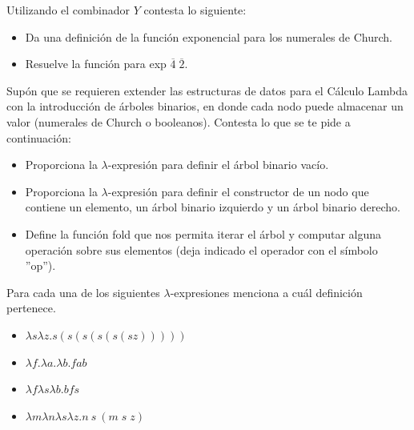                 \begin{exercise}
                    Utilizando el combinador $Y$ contesta lo siguiente: \\
                    \begin{itemize}
                    	\item Da una definición de la función exponencial para los numerales de Church.
                    	\item Resuelve la función para \textsf{exp} $\overline{4} \; \overline{2}$.
		    \end{itemize}
                \end{exercise}


		\begin{exercise}
			Supón que se requieren extender las estructuras de datos para el Cálculo Lambda con la introducción de árboles binarios, en donde cada nodo puede almacenar un valor (numerales de Church o booleanos). Contesta lo que se te pide a continuación:\\
			\begin{itemize}
				\item Proporciona la $\lambda$-expresión para definir el árbol binario vacío.
				\item Proporciona la $\lambda$-expresión para definir el constructor de un nodo que contiene un elemento, un árbol binario izquierdo y un árbol binario derecho.
				\item Define la función \textsf{fold} que nos permita iterar el árbol y computar alguna operación sobre sus elementos (deja indicado el operador con el símbolo ''op'').
			\end{itemize}
		\end{exercise}



		\begin{exercise}
			Para cada una de los siguientes $\lambda$-expresiones menciona a cuál definición pertenece. \\
			\begin{itemize}
				\item $\lambda s\lambda z.s(s(s(s(s(sz)))))$
				\item $\lambda f.\lambda a.\lambda b.fab $
				\item $\lambda f\lambda s\lambda b. bfs$
				\item $\lambda m\lambda n\lambda s\lambda z.n\ s\  (m \; s \; z)$
			\end{itemize}
		\end{exercise}

                    
            
